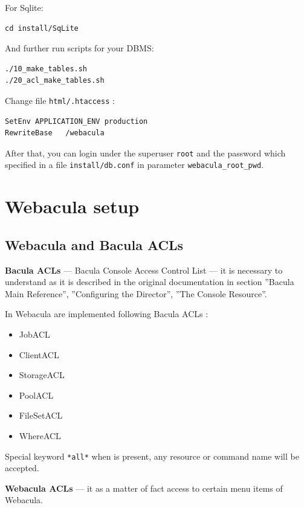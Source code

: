 \documentclass[10pt]{article}
\begin{document}
For Sqlite:
\begin{verbatim}
cd install/SqLite
\end{verbatim}

And further run scripts for your DBMS:
\begin{verbatim}
./10_make_tables.sh
./20_acl_make_tables.sh
\end{verbatim}

Change file \texttt{html/.htaccess} :
\begin{verbatim}
SetEnv APPLICATION_ENV production
RewriteBase   /webacula
\end{verbatim}

After that, you can login under the superuser \texttt{root} and the password which specified in a file \texttt{install/db.conf}
in parameter \texttt{webacula\_root\_pwd}.



\section{Webacula setup}
\label{Setup}



\subsection{Webacula and Bacula ACLs}
\label{Setup:Webacula and Bacula ACLs}

\textbf{Bacula ACLs} --- Bacula Console Access Control List ---
it is necessary to understand as it is described in the original documentation in section
''Bacula Main Reference'', ''Configuring the Director'', ''The Console Resource''.

In Webacula are implemented following Bacula ACLs :
\begin{itemize}
  \item JobACL
  \item ClientACL
  \item StorageACL
  \item PoolACL
  \item FileSetACL
  \item WhereACL
\end{itemize}

Special keyword \texttt{*all*} when is present, any resource or command name will be accepted.

\textbf{Webacula ACLs} --- it as a matter of fact access to certain menu items of Webacula.
\end{document}
